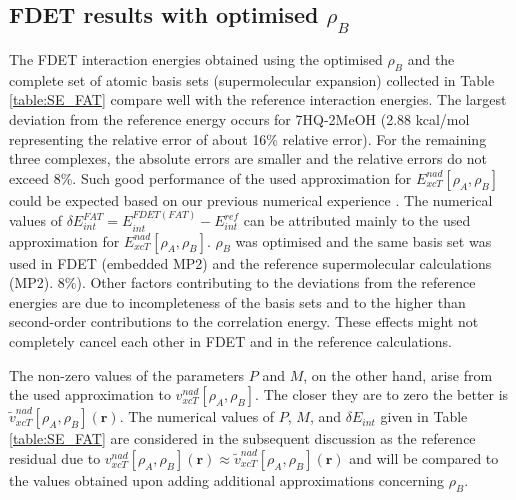 \documentclass[journal=jctcce,manuscript=article]{achemso}
\begin{document}
\subsection{FDET results with optimised $\rho_B$}
The FDET interaction energies  obtained using the optimised $\rho_B$ and the complete set of atomic basis sets (supermolecular expansion) collected in Table \ref{table:SE_FAT} compare well with the reference interaction energies.  
The largest deviation from the reference energy occurs for 7HQ-2MeOH (2.88 kcal/mol representing the relative error of about 16\% relative error). 
For the remaining three complexes, the absolute errors are smaller and the relative errors do not exceed 8\%.
Such good performance of the used approximation for $E_{xcT}^{nad}[\rho_A,\rho_B]$
could be expected based on our previous numerical experience \cite{Wesolowski2003a,Kevorkyants2006,Dulak2007a}. The numerical values of $
\delta E_{int}^{FAT}=E^{FDET(FAT)}_{int}-E_{int}^{ref}\label{eq:def_err_en}$
 can be attributed mainly to the used  approximation for $E_{xcT}^{nad}[\rho_A,\rho_B]$. 
 $\rho_B$ was optimised and the same basis set was used in FDET (embedded MP2) and the reference supermolecular calculations (MP2). 8\%). 
Other factors contributing to the deviations from the reference energies are due to incompleteness of the basis sets and to the higher than second-order contributions to the correlation energy. These effects might not completely cancel each other in FDET and in the reference calculations. 

The non-zero values of  the parameters $P$ and $M$, on the other hand, arise from the used approximation to $v_{xcT}^{nad}[\rho_A,\rho_B]$. 
The closer they are to zero the better is $\tilde{v}_{xcT}^{nad}[\rho_A,\rho_B](\mathbf{r})$.
The numerical values of $P$, $M$, and $\delta E_{int}$ given in Table \ref{table:SE_FAT} are considered in the subsequent discussion as the reference residual due to ${v}_{xcT}^{nad}[\rho_A,\rho_B](\mathbf{r})\approx\tilde{v}_{xcT}^{nad}[\rho_A,\rho_B](\mathbf{r})$ and will be compared to the values obtained upon adding additional approximations concerning  $\rho_B$.
\end{document}

